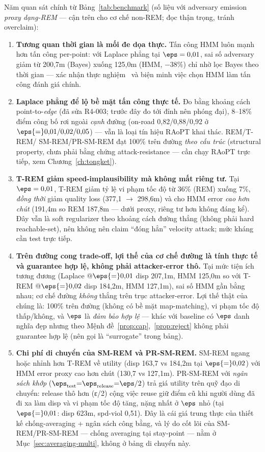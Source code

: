 Năm quan sát chính từ Bảng~\ref{tab:benchmark} (số liệu với adversary emission
\emph{proxy dạng-REM} --- cận trên cho cơ chế non-REM; đọc thận trọng, tránh overclaim):

\begin{enumerate}
  \item \textbf{Tương quan thời gian là mối đe dọa thực.} Tấn công HMM luôn
  mạnh hơn tấn công per-point: với Laplace phẳng tại $\eps = 0{,}01$, sai số
  adversary giảm từ 200,7m (Bayes) xuống 125,0m (HMM, $-38\%$) chỉ nhờ lọc Bayes
  theo thời gian --- xác nhận thực nghiệm~\cite{xiao2015protecting} và biện minh
  việc chọn HMM làm tấn công đánh giá chính.
  \item \textbf{Laplace phẳng để lộ bề mặt tấn công thực tế.} Đo bằng khoảng cách
  point-to-\emph{edge} (đã sửa R4-003; trước đây đo tới đỉnh nên phóng đại), 8--18\%
  điểm công bố rơi ngoài \emph{cạnh} đường (on-road 0,82/0,88/0,92 ở
  $\eps{=}0{,}01/0{,}02/0{,}05$) --- vẫn là loại tín hiệu RAoPT khai thác. REM/T-REM/
  SM-REM/PR-SM-REM đạt 100\% trên đường \emph{theo cấu trúc} (structural property,
  chưa phải bằng chứng attack-resistance --- cần chạy RAoPT trực tiếp,
  xem Chương~\ref{ch:tongket}).
  \item \textbf{T-REM giảm speed-implausibility mà không mất riêng tư.} Tại
  $\eps = 0{,}01$, T-REM giảm tỷ lệ vi phạm tốc độ từ 36\% (REM) xuống 7\%,
  \emph{đồng thời} giảm quality loss (377,1 $\to$ 298,6m) và cho HMM error
  \emph{cao hơn chút} (191,4m so REM 187,8m --- dưới proxy, riêng tư hơn không đáng
  kể). Đây vẫn là soft regularizer theo khoảng cách đường thẳng (không phải hard
  reachable-set), nên không nên claim ``đóng hẳn'' velocity attack; mức kháng
  cần test trực tiếp.
  \item \textbf{Trên đường cong trade-off, lợi thế của cơ chế đường là tính thực
  tế và guarantee hợp lệ, không phải attacker-error thô.} Tại mức tiện ích tương
  đương (Laplace @$\eps{=}0{,}01$ disp 207,1m, HMM 125,0m so với T-REM
  @$\eps{=}0{,}02$ disp 184,2m, HMM 127,1m), sai số HMM gần bằng nhau; cơ chế
  đường \emph{không} thắng trên trục attacker-error. Lợi thế thật của chúng là:
  100\% trên đường (không có bề mặt map-matching), vi phạm tốc độ thấp/không, và
  $\eps$ là \emph{đảm bảo hợp lệ} --- khác với baseline có $\eps$ danh nghĩa đẹp
  nhưng theo Mệnh đề~\ref{prop:cap},~\ref{prop:reject} không phải guarantee hợp
  lệ (nên gọi là ``surrogate'' trong bảng).
  \item \textbf{Chi phí di chuyển của SM-REM và PR-SM-REM.} SM-REM ngang hoặc
  nhỉnh hơn T-REM về utility (disp 163,7 vs 184,2m tại $\eps{=}0{,}02$) với HMM
  error proxy cao hơn chút (130,7 vs 127,1m).
  PR-SM-REM với \emph{ngân sách khớp} ($\eps_{\text{test}}{=}\eps_{\text{release}}
  {=}\eps/2$) trả giá utility trên quỹ đạo di chuyển: release thô hơn (ε/2) cộng
  việc reuse giữ điểm cũ khi người dùng đã đi xa làm disp và vi phạm tốc độ tăng,
  nặng nhất ở $\eps$ nhỏ (tại $\eps{=}0{,}01$: disp 623m, spd-viol 0,51). Đây là
  cái giá trung thực của thiết kế chống-averaging + ngân sách công bằng, và lý do
  cốt lõi của SM-REM/PR-SM-REM --- chống averaging tại stay-point --- nằm ở
  Mục~\ref{sec:averaging-multi}, không ở bảng di chuyển này.
\end{enumerate}

